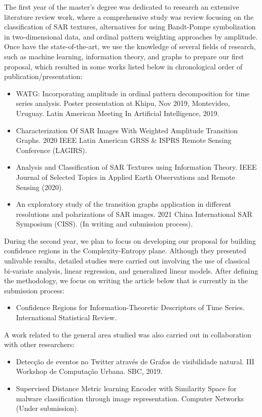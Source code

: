 The first year of the master's degree was dedicated to research an extensive literature review work, where a comprehensive study was review focusing on the classification of SAR textures, alternatives for using Bandt-Pompe symbolization in two-dimensional data, and ordinal pattern weighting approaches by amplitude.
Once have the state-of-the-art, we use the knowledge of several fields of research, such as machine learning, information theory, and graphs to prepare our first proposal, which resulted in some works listed below in chronological order of publication/presentation:
\begin{itemize}
    \item WATG: Incorporating amplitude in ordinal pattern decomposition for time series analysis. Poster presentation at Khipu, Nov 2019, Montevideo, Uruguay. Latin American Meeting In Artificial Intelligence, 2019.
    \item Characterization Of SAR Images With Weighted Amplitude Transition Graphs. 2020 IEEE Latin American GRSS \& ISPRS Remote Sensing Conference (LAGIRS).
    \item Analysis and Classification of SAR Textures using Information Theory. IEEE Journal of Selected Topics in Applied Earth Observations and Remote Sensing (2020).
    \item An exploratory study of the transition graphs application in different resolutions and polarizations of SAR images. 2021 China International SAR Symposium (CISS). (In writing and submission process).
\end{itemize}
During the second year, we plan to focus on developing our proposal for building confidence regions in the Complexity-Entropy plane.
Although they presented unlivable results, detailed studies were carried out involving the use of classical bi-variate analysis, linear regression, and generalized linear models.
After defining the methodology, we focus on writing the article below that is currently in the submission process:
\begin{itemize}
    \item Confidence Regions for Information-Theoretic Descriptors of Time Series. International Statistical Review.
\end{itemize}
A work related to the general area studied was also carried out in collaboration with other researchers:
\begin{itemize}
    \item Detecção de eventos no Twitter através de Grafos de visibilidade natural. III Workshop de Computação Urbana. SBC, 2019.
    \item Supervised Distance Metric learning Encoder with Similarity Space for malware classification through image representation. Computer Networks (Under submission). 
\end{itemize}

